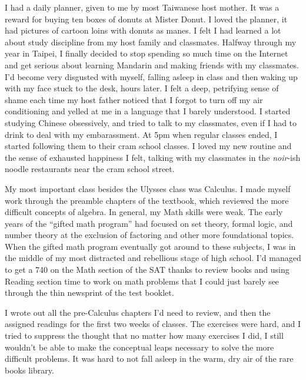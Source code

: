 I had a daily planner, given to me by most Taiwanese host mother.  It was a
reward for buying ten boxes of donuts at Mister Donut.  I loved the planner, it
had pictures of cartoon loins with donuts as manes. I felt I had learned a lot
about study discipline from my host family and classmates.  Halfway through my
year in Taipei, I finally decided to stop spending so much time on the Internet
and get serious about learning Mandarin and making friends with my classmates.
I'd become very disgusted with myself, falling asleep in class and then waking
up with my face stuck to the desk, hours later.  I felt a deep, petrifying sense
of shame each time my host father noticed that I forgot to turn off my air
conditioning and yelled at me in a language that I barely understood.  I started
studying Chinese obsessively, and tried to talk to my classmates, even if I had
to drink to deal with my embarassment.  At 5pm when regular classes ended, I
started following them to their cram school classes.  I loved my new routine and
the sense of exhausted happiness I felt, talking with my classmates in the
\textit{noir}-ish noodle restaurants near the cram school street. 

My most important class besides the Ulysses class was Calculus.  I made myself
work through the preamble chapters of the textbook, which reviewed the more
difficult concepts of algebra.  In general, my Math skills were weak.  The early
years of the ``gifted math program'' had focused on set theory, formal logic,
and number theory at the exclusion of factoring and other more foundational
topics.  When the gifted math program eventually got around to these subjects, I
was in the middle of my most distracted and rebellious stage of high school.
I'd managed to get a 740 on the Math section of the SAT thanks to review books
and using Reading section time to work on math problems that I could just barely
see through the thin newsprint of the test booklet. 


I wrote out all the pre-Calculus chapters I'd need to review, and then the
assigned readings for the first two weeks of classes.  The exercises were hard,
and I tried to suppress the thought that no matter how many exercises I did, I
still wouldn't be able to make the conceptual leaps necessary to solve the more
difficult problems.  It was hard to not fall asleep in the warm, dry air of the
rare books library.

\section{}

